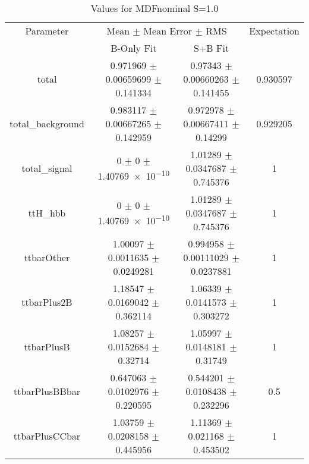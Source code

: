 \begin{table}
\centering
\caption{Values for MDFnominal S=1.0}
\begin{tabular}{cccc}
\toprule
Parameter & \multicolumn{2}{c}{Mean $\pm$ Mean Error $\pm$ RMS} & Expectation\\
 & B-Only Fit & S+B Fit & \\
\midrule
total & \num{0.971969} $\pm$ \num{0.00659699} $\pm$ \num{0.141334} & \num{0.97343} $\pm$ \num{0.00660263} $\pm$ \num{0.141455} & \num{0.930597}\\
total\_background & \num{0.983117} $\pm$ \num{0.00667265} $\pm$ \num{0.142959} & \num{0.972978} $\pm$ \num{0.00667411} $\pm$ \num{0.14299} & \num{0.929205}\\
total\_signal & \num{0} $\pm$ \num{0} $\pm$ \num{1.40769e-10} & \num{1.01289} $\pm$ \num{0.0347687} $\pm$ \num{0.745376} & \num{1}\\
ttH\_hbb & \num{0} $\pm$ \num{0} $\pm$ \num{1.40769e-10} & \num{1.01289} $\pm$ \num{0.0347687} $\pm$ \num{0.745376} & \num{1}\\
ttbarOther & \num{1.00097} $\pm$ \num{0.0011635} $\pm$ \num{0.0249281} & \num{0.994958} $\pm$ \num{0.00111029} $\pm$ \num{0.0237881} & \num{1}\\
ttbarPlus2B & \num{1.18547} $\pm$ \num{0.0169042} $\pm$ \num{0.362114} & \num{1.06339} $\pm$ \num{0.0141573} $\pm$ \num{0.303272} & \num{1}\\
ttbarPlusB & \num{1.08257} $\pm$ \num{0.0152684} $\pm$ \num{0.32714} & \num{1.05997} $\pm$ \num{0.0148181} $\pm$ \num{0.31749} & \num{1}\\
ttbarPlusBBbar & \num{0.647063} $\pm$ \num{0.0102976} $\pm$ \num{0.220595} & \num{0.544201} $\pm$ \num{0.0108438} $\pm$ \num{0.232296} & \num{0.5}\\
ttbarPlusCCbar & \num{1.03759} $\pm$ \num{0.0208158} $\pm$ \num{0.445956} & \num{1.11369} $\pm$ \num{0.021168} $\pm$ \num{0.453502} & \num{1}\\
\bottomrule
\end{tabular}
\end{table}